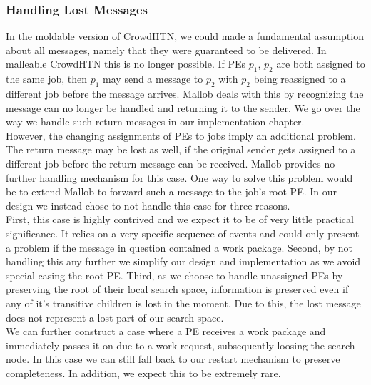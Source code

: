 \subsubsection{Handling Lost Messages}
In the moldable version of CrowdHTN, we could made a fundamental assumption about all messages, namely that they were guaranteed to be delivered. In malleable CrowdHTN this is no longer possible. If PEs $p_1$, $p_2$ are both assigned to the same job, then $p_1$ may send a message to $p_2$ with $p_2$ being reassigned to a different job before the message arrives. Mallob deals with this by recognizing the message can no longer be handled and returning it to the sender. We go over the way we handle such return messages in our implementation chapter. \\ 
However, the changing assignments of PEs to jobs imply an additional problem. The return message may be lost as well, if the original sender gets assigned to a different job before the return message can be received. Mallob provides no further handling mechanism for this case. One way to solve this problem would be to extend Mallob to forward such a message to the job's root PE. In our design we instead chose to not handle this case for three reasons. \\
First, this case is highly contrived and we expect it to be of very little practical significance. It relies on a very specific sequence of events and could only present a problem if the message in question contained a work package. Second, by not handling this any further we simplify our design and implementation as we avoid special-casing the root PE. Third, as we choose to handle unassigned PEs by preserving the root of their local search space, information is preserved even if any of it's transitive children is lost in the moment. Due to this, the lost message does not represent a lost part of our search space. \\
We can further construct a case where a PE receives a work package and immediately passes it on due to a work request, subsequently loosing the search node. In this case we can still fall back to our restart mechanism to preserve completeness. In addition, we expect this to be extremely rare.
